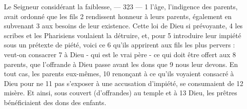 Le Seigneur considérant la faiblesse,	 
 	--- 323 ---	 
1	 	l'âge, l'indigence des parents, avait ordonné que les fils	 
2	 	rendissent honneur à leurs parents, également en subvenant	 
3	 	aux besoins de leur existence. Cette loi de Dieu si prévoyante,	 
4	 	les scribes et les Pharisiens voulaient la détruire, et, pour	 
5	 	introduire leur impiété sous un prétexte de piété, voici ce	 
6	 	qu'ils apprirent aux fils les plus pervers : veut-on consacrer	 
7	 	à Dieu - qui est le vrai père - ce qui doit être offert aux	 
8	 	parents, que l'offrande à Dieu passe avant les dons que	 
9	 	nous leur devons. En tout cas, les parents eux-mêmes,	 
10	 	renonçant à ce qu'ils voyaient consacré à Dieu pour ne	 
11	 	pas s'exposer à une accusation d'impiété, se consumaient de	 
12	 	misère. Et ainsi, sous couvert (d'offrandes) au temple et à	 
13	 	Dieu, les prêtres bénéficiaient des dons des enfants.